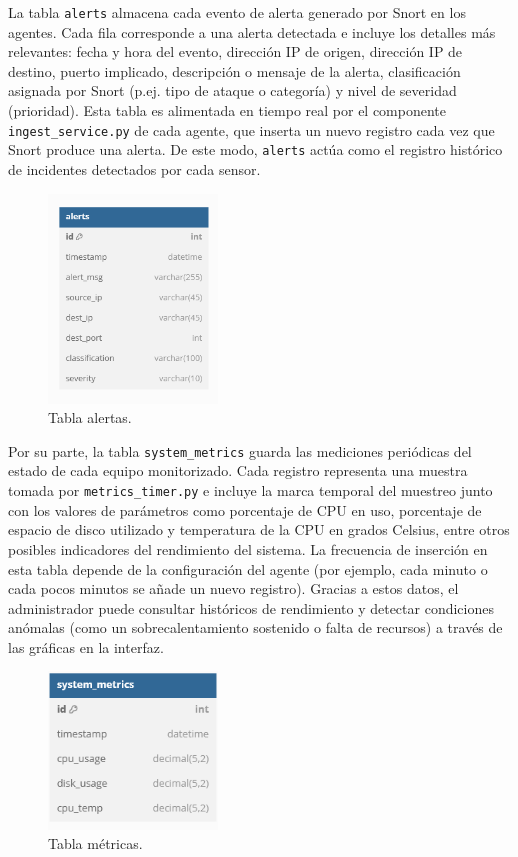 \documentclass[11pt,a4paper,twoside]{report}
\begin{document}
La tabla \texttt{alerts} almacena cada evento de alerta generado por Snort en los agentes. Cada fila corresponde a una alerta detectada e incluye los detalles más relevantes: fecha y hora del evento, dirección IP de origen, dirección IP de destino, puerto implicado, descripción o mensaje de la alerta, clasificación asignada por Snort (p.ej. tipo de ataque o categoría) y nivel de severidad (prioridad). Esta tabla es alimentada en tiempo real por el componente \texttt{ingest\_service.py} de cada agente, que inserta un nuevo registro cada vez que Snort produce una alerta. De este modo, \texttt{alerts} actúa como el registro histórico de incidentes detectados por cada sensor.\newline

\begin{figure}[H]
	\centering
	\includegraphics[width=0.4\textwidth]{documento/7.png}
	\caption{Tabla alertas.}
	\label{fig:alertas-bd}
\end{figure}

Por su parte, la tabla \texttt{system\_metrics} guarda las mediciones periódicas del estado de cada equipo monitorizado. Cada registro representa una muestra tomada por \texttt{metrics\_timer.py} e incluye la marca temporal del muestreo junto con los valores de parámetros como porcentaje de CPU en uso, porcentaje de espacio de disco utilizado y temperatura de la CPU en grados Celsius, entre otros posibles indicadores del rendimiento del sistema. La frecuencia de inserción en esta tabla depende de la configuración del agente (por ejemplo, cada minuto o cada pocos minutos se añade un nuevo registro). Gracias a estos datos, el administrador puede consultar históricos de rendimiento y detectar condiciones anómalas (como un sobrecalentamiento sostenido o falta de recursos) a través de las gráficas en la interfaz.\newline

\begin{figure}[H]
	\centering
	\includegraphics[width=0.4\textwidth]{documento/8.png}
	\caption{Tabla métricas.}
	\label{fig:metricas-bd}
\end{figure}
\end{document}
